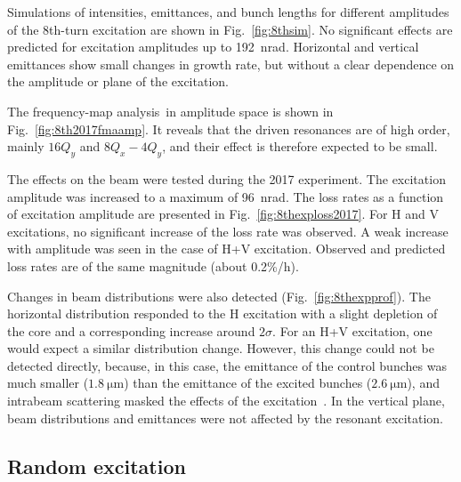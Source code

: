 \documentclass[
prstab
,reprint
,linenumbers
,longbibliography
,preprintnumbers
,showkeys
,amsfonts,amssymb,amsmath
,floatfix
]{revtex4-1}
\newcommand{\q}[2]{\ensuremath{#1\ \mathrm{#2}}} %
\newcommand{\fma}{frequency-map analysis}
\begin{document}
Simulations of intensities, emittances, and bunch lengths for
different amplitudes of the 8th-turn excitation are shown in
Fig.~\ref{fig:8thsim}. No significant effects are predicted for
excitation amplitudes up to 192~nrad. Horizontal and vertical
emittances show small changes in growth rate, but without a clear
dependence on the amplitude or plane of the excitation.

The \fma\ in amplitude space is shown in
Fig.~\ref{fig:8th2017fmaamp}. It reveals that the driven resonances
are of high order, mainly $16 Q_y$ and \mbox{$8 Q_x - 4 Q_y$}, and
their effect is therefore expected to be small.

The effects on the beam were tested during the 2017 experiment. The
excitation amplitude was increased to a maximum of 96~nrad. The loss
rates as a function of excitation amplitude are presented in
Fig.~\ref{fig:8thexploss2017}. For H and V excitations, no significant
increase of the loss rate was observed. A weak increase with amplitude
was seen in the case of H+V excitation. Observed and predicted loss
rates are of the same magnitude (about 0.2\%/h).

Changes in beam distributions were also detected
(Fig.~\ref{fig:8thexpprof}). The horizontal distribution responded to
the H excitation with a slight depletion of the core and a
corresponding increase around $2\sigma$. For an H+V excitation, one
would expect a similar distribution change. However, this change could
not be detected directly, because, in this case, the emittance of the
control bunches was much smaller (\q{1.8}{\mu m}) than the emittance
of the excited bunches (\q{2.6}{\mu m}), and intrabeam scattering
masked the effects of the excitation~\cite{resexmd2017}. In the
vertical plane, beam distributions and emittances were not affected
by the resonant excitation.



\subsection{Random excitation}
\label{sec:simexran}
\end{document}
